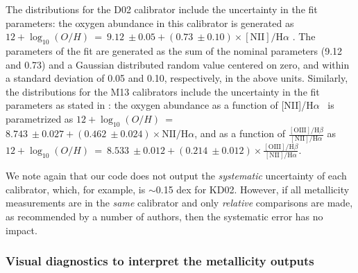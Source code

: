 \documentclass{emulateapj} \usepackage{amsmath} \usepackage{float}
\newcommand{\oxabinline}{\ensuremath{12 + \log_{10}(O/H)}}
\newcommand{\ha}{\ensuremath{\mathrm{H}\alpha}}
\begin{document}
The distributions for the D02 calibrator include the uncertainty in
the fit parameters: the oxygen abundance in this calibrator is
generated as \oxabinline~=~$9.12~\pm 0.05 + (0.73~\pm
0.10)\times\mathrm{[NII]}/\ha$ \citep{denicolo02}. The parameters of
the fit are generated as the sum of the nominal parameters (9.12 and
0.73) and a Gaussian distributed random value centered on zero, and
within a standard deviation of 0.05 and 0.10, respectively, in the
above units.  Similarly, the distributions for the M13 calibrators
include the uncertainty in the fit parameters as stated in
\citet{marino13}: the oxygen abundance as a function of [NII]/\ha~ is
parametrized as \oxabinline~=~$8.743~\pm 0.027 + (0.462~\pm
0.024)\times\mathrm{NII}/\ha$, and as a function of
$\frac{\mathrm{[OIII]/H}\beta} {\mathrm{[NII]/H}\alpha}$ as
\oxabinline~=~$8.533~\pm 0.012 + (0.214~\pm
0.012)\times\frac{\mathrm{[OIII]/H}\beta} {\mathrm{[NII]/H}\alpha}$.

We note again that our code does not output the \emph{systematic}
uncertainty of each calibrator, which, for example, is $\sim$0.15
\nolinebreak dex for KD02. However, if all metallicity measurements
are in the \emph{same} calibrator and only \emph{relative} comparisons
are made, as recommended by a number of authors, then the systematic
error has no impact.




\subsubsection{Visual diagnostics to interpret the metallicity outputs}\label{vizs}
\end{document}
